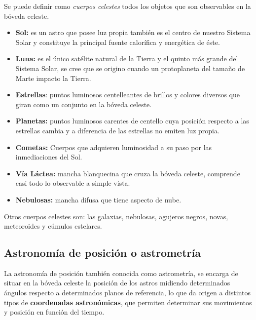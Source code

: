 \documentclass[10pt,a4paper]{article}
\begin{document}
Se puede definir como \textit{cuerpos celestes} todos los objetos que son observables en la bóveda celeste.

\begin{itemize}
\item \textbf{Sol:} es un astro que posee luz propia también es el centro de nuestro Sistema Solar y constituye la principal fuente calorífica y energética de éste.
\item \textbf{Luna:} es el único satélite natural de la Tierra y el quinto más grande del Sistema Solar, se cree que se origino cuando un protoplaneta del tamaño de Marte impacto la Tierra.
\item \textbf{Estrellas}: puntos luminosos centelleantes de brillos y colores diversos que giran como un conjunto en la bóveda celeste.
\item \textbf{Planetas:} puntos luminosos carentes de centello cuya posición respecto a las estrellas cambia y a diferencia de las estrellas no emiten luz propia. 
\item \textbf{Cometas:} Cuerpos que adquieren luminosidad a su paso por las inmediaciones del Sol. 
\item \textbf{Vía Láctea:} mancha blanquecina que cruza la bóveda celeste, comprende casi todo lo observable a simple vista.
\item \textbf{Nebulosas:} mancha difusa que tiene aspecto de nube. 
\end{itemize}

Otros cuerpos celestes son: las galaxias, nebulosas, agujeros negros, novas, meteoroides y cúmulos estelares.

\subsection{Astronomía de posición o astrometría}
La astronomía de posición también conocida como astrometría, se encarga de situar en la bóveda celeste la posición de los astros midiendo determinados ángulos respecto a determinados planos de referencia, lo que da origen a distintos tipos de \textbf{coordenadas astronómicas}, que permiten determinar sus movimientos y posición en función del tiempo.
\end{document}
